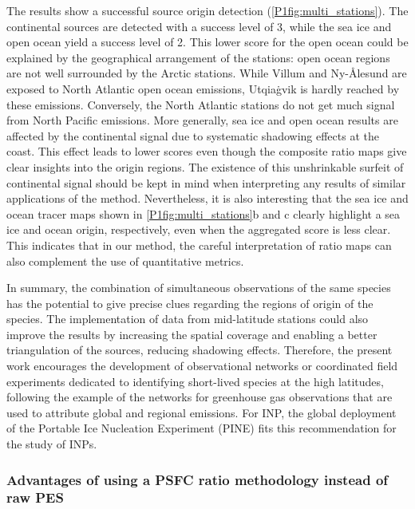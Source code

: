         The results show a successful source origin detection (\cref{P1fig:multi_stations}).
        The continental sources are detected with a success level of 3, while the sea ice and open ocean yield a success level of 2.
        This lower score for the open ocean could be explained by the geographical arrangement of the stations: open ocean regions are not well surrounded by the Arctic stations. While Villum and Ny-Ålesund are exposed to North Atlantic open ocean emissions, Utqiaġvik is hardly reached by these emissions. Conversely, the North Atlantic stations do not get much signal from North Pacific emissions.
        More generally, sea ice and open ocean results are affected by the continental signal due to systematic shadowing effects at the coast.
        This effect leads to lower scores even though the composite ratio maps give clear insights into the origin regions.
        The existence of this unshrinkable surfeit of continental signal should be kept in mind when interpreting any results of similar applications of the method.
        Nevertheless, it is also interesting that the sea ice and ocean tracer maps shown in \cref{P1fig:multi_stations}b and c clearly highlight a sea ice and ocean origin, respectively, even when the aggregated score is less clear. This indicates that in our method, the careful interpretation of ratio maps can also complement the use of quantitative metrics.

        In summary, the combination of simultaneous observations of the same species has the potential to give precise clues regarding the regions of origin of the species.
        The implementation of data from mid-latitude stations could also improve the results by increasing the spatial coverage and enabling a better triangulation of the sources, reducing shadowing effects.
        Therefore, the present work encourages the development of observational networks or coordinated field experiments dedicated to identifying short-lived species at the high latitudes, following the example of the networks for greenhouse gas observations that are used to attribute global and regional emissions. For INP, the global deployment of the Portable Ice Nucleation Experiment (PINE) \citep{mohler_portable_2021} fits this recommendation for the study of INPs.

    \subsubsection{Advantages of using a PSFC ratio methodology instead of raw PES}
    \label{P1sec:point_ratio}

